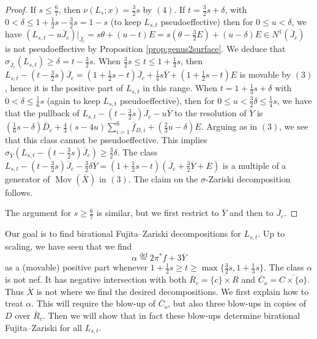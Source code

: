 \documentclass[12pt]{amsart}
\theoremstyle{definition}
\renewcommand{\geq}{\geqslant}
\renewcommand{\leq}{\leqslant}
\DeclareMathOperator{\Mov}{Mov}
\newcommand{\deq}{\ensuremath{\stackrel{\textrm{def}}{=}}}
\newcommand{\?}{ \circled{{\large\bf ?}}}
\begin{document}
\begin{proof}
	If $s\leq\frac 67$, then $\nu(L_s;x)=\frac 32s$ by $(4)$. If $t=\frac 32s+\delta$, with $0<\delta\leq 1+\frac 12s-\frac 32s=1-s$ (to keep $L_{s,t}$ pseudoeffective) then for $0\leq u< \delta$, we have $(L_{s,t}-u\overline J_c)|_{\overline J_c}=s\theta +(u-t)E=s(\theta-\frac 32E)+(u-\delta)E\in N^1(\overline J_c)$ is not pseudoeffective by Proposition \ref{prop:genus2surface}. We deduce that $\sigma_{\overline J_c}(L_{s,t})\geq\delta=t-\frac 32s$. When $\frac 32s\leq t\leq 1+\frac 13s$, then $L_{s,t}-(t-\frac 32s)\overline J_c=(1+\frac 12s-t)\overline J_c+\frac 14s\overline Y+(1+\frac 12s-t)E$ is movable by $(3)$, hence it is the positive part of $L_{s,t}$ in this range.	
	When $t=1+\frac 13s+\delta$ with $0<\delta\leq\frac 16s$ (again to keep $L_{s,t}$ pseudoeffective), then for $0\leq u<\frac 32\delta\leq\frac 14s$, we have that the pullback of $L_{s,t}-(t-\frac 32s)\overline J_c-u\overline Y$ to the resolution of $\overline Y$ is $(\frac 16s-\delta)\overline D_c+\frac 43(s-4u)\sum_{i=1}^6\overline f_{D,i}+(\frac 23u-\delta)E$. Arguing as in $(3)$, we see that this class cannot be pseudoeffective. This implies $\sigma_{\overline Y}(L_{s,t}-(t-\frac 32s)\overline J_c)\geq \frac 32\delta$. The class $L_{s,t}-(t-\frac 32s)\overline J_c-\frac 32\delta\overline Y=(1+\frac 12s-t)(\overline J_c+\frac 32\overline Y+E)$ is a multiple of a generator of $\Mov(\overline X)$ in $(3)$. The claim on the $\sigma$-Zariski decomposition follows.
	
	The argument for $s\geq\frac 67$ is similar, but we first restrict to $\overline Y$ and then to $\overline J_c$.
\end{proof}

Our goal is to find birational Fujita--Zariski decompositions for $L_{s,t}$. 
Up to scaling, we have seen that we find 
\[\alpha\deq 2\pi^*f+3\overline Y\]
 as a (movable) positive part whenever $1+\frac 12s\geq t\geq\max\{\frac 32s,1+\frac 13s\}$. The class $\alpha$ is not nef. It has negative intersection with both
$\overline R_c=\overline{\{c\}\times R}$ and $\overline C_o=\overline{C\times\{o\}}$. 
Thus $\overline X$ is not where we find the desired decompositions.
We first explain how to treat $\alpha$. This will require the blow-up of $\overline C_o$, but also three blow-ups in copies of $D$ over $\overline R_c$. Then we will show that in fact these blow-ups determine birational Fujita--Zariski for all $L_{s,t}$.
\end{document}
